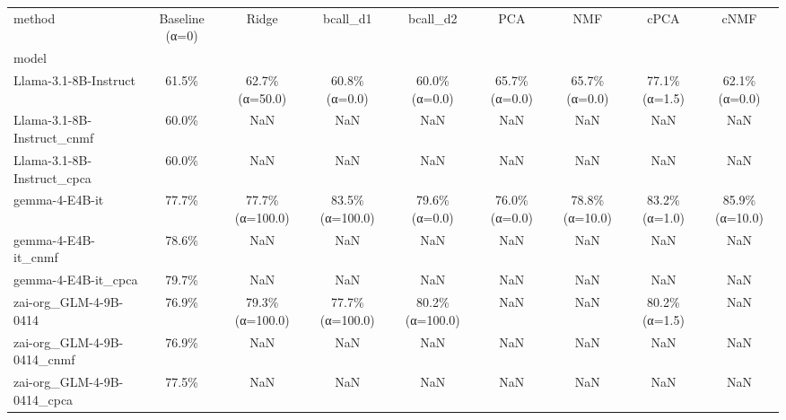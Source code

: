\begin{tabular}{lcccccccc}
\toprule
method & Baseline (α=0) & Ridge & bcall_d1 & bcall_d2 & PCA & NMF & cPCA & cNMF \\
model &  &  &  &  &  &  &  &  \\
\midrule
Llama-3.1-8B-Instruct & 61.5\% & 62.7\% \scriptsize{(α=50.0)} & 60.8\% \scriptsize{(α=0.0)} & 60.0\% \scriptsize{(α=0.0)} & 65.7\% \scriptsize{(α=0.0)} & 65.7\% \scriptsize{(α=0.0)} & 77.1\% \scriptsize{(α=1.5)} & 62.1\% \scriptsize{(α=0.0)} \\
Llama-3.1-8B-Instruct_cnmf & 60.0\% & NaN & NaN & NaN & NaN & NaN & NaN & NaN \\
Llama-3.1-8B-Instruct_cpca & 60.0\% & NaN & NaN & NaN & NaN & NaN & NaN & NaN \\
gemma-4-E4B-it & 77.7\% & 77.7\% \scriptsize{(α=100.0)} & 83.5\% \scriptsize{(α=100.0)} & 79.6\% \scriptsize{(α=0.0)} & 76.0\% \scriptsize{(α=0.0)} & 78.8\% \scriptsize{(α=10.0)} & 83.2\% \scriptsize{(α=1.0)} & 85.9\% \scriptsize{(α=10.0)} \\
gemma-4-E4B-it_cnmf & 78.6\% & NaN & NaN & NaN & NaN & NaN & NaN & NaN \\
gemma-4-E4B-it_cpca & 79.7\% & NaN & NaN & NaN & NaN & NaN & NaN & NaN \\
zai-org_GLM-4-9B-0414 & 76.9\% & 79.3\% \scriptsize{(α=100.0)} & 77.7\% \scriptsize{(α=100.0)} & 80.2\% \scriptsize{(α=100.0)} & NaN & NaN & 80.2\% \scriptsize{(α=1.5)} & NaN \\
zai-org_GLM-4-9B-0414_cnmf & 76.9\% & NaN & NaN & NaN & NaN & NaN & NaN & NaN \\
zai-org_GLM-4-9B-0414_cpca & 77.5\% & NaN & NaN & NaN & NaN & NaN & NaN & NaN \\
\bottomrule
\end{tabular}
